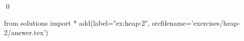 
\begin{ex} 
  \label{ex:heap-2}
  
  \qed
\end{ex} 
\begin{python0}
from solutions import *
add(label="ex:heap-2",
    srcfilename='exercises/heap-2/answer.tex') 
\end{python0}
